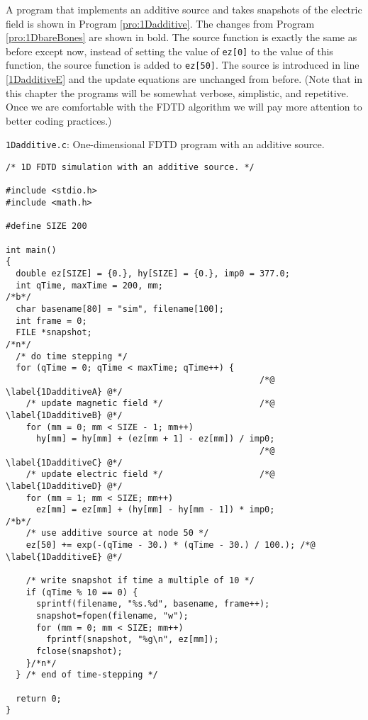 A program that implements an additive source and takes snapshots of
the electric field is shown in Program \ref{pro:1Dadditive}.  The
changes from Program \ref{pro:1DbareBones} are shown in bold.  The
source function is exactly the same as before except now, instead of
setting the value of {\tt ez[0]} to the value of this function, the
source function is added to {\tt ez[50]}.  The source is introduced in
line \ref{1DadditiveE} and the update equations are unchanged from
before.  (Note that in this chapter the programs will be somewhat
verbose, simplistic, and repetitive.  Once we are comfortable with the
FDTD algorithm we will pay more attention to better coding practices.)
\begin{program}
{\tt 1Dadditive.c}: 
One-dimensional FDTD program with an additive
source. \label{pro:1Dadditive} 
\codemiddle
\begin{lstlisting}
/* 1D FDTD simulation with an additive source. */

#include <stdio.h>
#include <math.h>

#define SIZE 200

int main()
{
  double ez[SIZE] = {0.}, hy[SIZE] = {0.}, imp0 = 377.0;
  int qTime, maxTime = 200, mm;
/*b*/
  char basename[80] = "sim", filename[100];
  int frame = 0;
  FILE *snapshot;
/*n*/
  /* do time stepping */
  for (qTime = 0; qTime < maxTime; qTime++) {
                                                  /*@ \label{1DadditiveA} @*/
    /* update magnetic field */                   /*@ \label{1DadditiveB} @*/
    for (mm = 0; mm < SIZE - 1; mm++)
      hy[mm] = hy[mm] + (ez[mm + 1] - ez[mm]) / imp0;
                                                  /*@ \label{1DadditiveC} @*/
    /* update electric field */                   /*@ \label{1DadditiveD} @*/
    for (mm = 1; mm < SIZE; mm++)
      ez[mm] = ez[mm] + (hy[mm] - hy[mm - 1]) * imp0;
/*b*/
    /* use additive source at node 50 */
    ez[50] += exp(-(qTime - 30.) * (qTime - 30.) / 100.); /*@ \label{1DadditiveE} @*/

    /* write snapshot if time a multiple of 10 */
    if (qTime % 10 == 0) {
      sprintf(filename, "%s.%d", basename, frame++);
      snapshot=fopen(filename, "w");
      for (mm = 0; mm < SIZE; mm++)
        fprintf(snapshot, "%g\n", ez[mm]);
      fclose(snapshot);
    }/*n*/
  } /* end of time-stepping */

  return 0;
}
\end{lstlisting}
\end{program}

